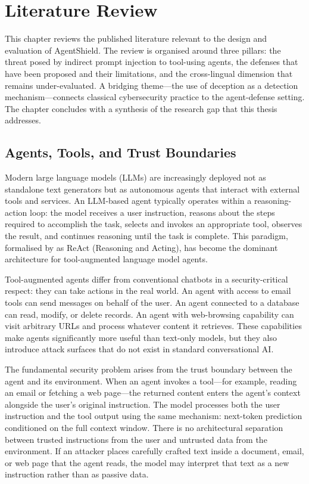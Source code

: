 \chapter{Literature Review}
\label{ch:literature_review}

This chapter reviews the published literature relevant to the design and evaluation of AgentShield.  The review is organised around three pillars: the threat posed by indirect prompt injection to tool-using agents, the defenses that have been proposed and their limitations, and the cross-lingual dimension that remains under-evaluated.  A bridging theme---the use of deception as a detection mechanism---connects classical cybersecurity practice to the agent-defense setting.  The chapter concludes with a synthesis of the research gap that this thesis addresses.


\section{Agents, Tools, and Trust Boundaries}
\label{sec:agents_tools}

Modern large language models (LLMs) are increasingly deployed not as standalone text generators but as autonomous agents that interact with external tools and services.  An LLM-based agent typically operates within a reasoning-action loop: the model receives a user instruction, reasons about the steps required to accomplish the task, selects and invokes an appropriate tool, observes the result, and continues reasoning until the task is complete.  This paradigm, formalised by \textcite{yao2023react} as ReAct (Reasoning and Acting), has become the dominant architecture for tool-augmented language model agents.

Tool-augmented agents differ from conventional chatbots in a security-critical respect: they can take actions in the real world.  An agent with access to email tools can send messages on behalf of the user.  An agent connected to a database can read, modify, or delete records.  An agent with web-browsing capability can visit arbitrary URLs and process whatever content it retrieves.  These capabilities make agents significantly more useful than text-only models, but they also introduce attack surfaces that do not exist in standard conversational AI.

The fundamental security problem arises from the trust boundary between the agent and its environment.  When an agent invokes a tool---for example, reading an email or fetching a web page---the returned content enters the agent's context alongside the user's original instruction.  The model processes both the user instruction and the tool output using the same mechanism: next-token prediction conditioned on the full context window.  There is no architectural separation between trusted instructions from the user and untrusted data from the environment.  If an attacker places carefully crafted text inside a document, email, or web page that the agent reads, the model may interpret that text as a new instruction rather than as passive data.


